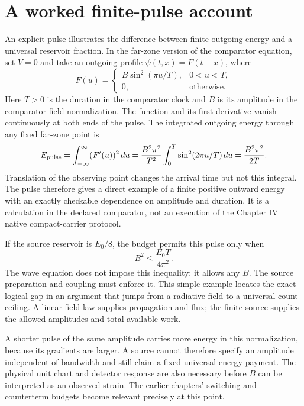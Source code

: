 \section{A worked finite-pulse account}
An explicit pulse illustrates the difference between finite outgoing energy and a universal reservoir fraction. In the far-zone version of the comparator equation, set $V=0$ and take an outgoing profile $\psi(t,x)=F(t-x)$, where
\begin{equation}
 F(u)=
 \begin{cases}
 B\sin^2(\pi u/T),&0<u<T,\\
 0,&\text{otherwise}.
 \end{cases}
 \label{c11:pulseprofile}
\end{equation}
Here $T>0$ is the duration in the comparator clock and $B$ is its amplitude in the comparator field normalization. The function and its first derivative vanish continuously at both ends of the pulse. The integrated outgoing energy through any fixed far-zone point is
\begin{equation}
 E_{\rm pulse}=\int_{-\infty}^{\infty}(F'(u))^2\,du
 =\frac{B^2\pi^2}{T^2}\int_0^T\sin^2(2\pi u/T)\,du
 =\frac{B^2\pi^2}{2T}.
 \label{c11:pulseenergy}
\end{equation}
Translation of the observing point changes the arrival time but not this integral. The pulse therefore gives a direct example of a finite positive outward energy with an exactly checkable dependence on amplitude and duration. It is a calculation in the declared comparator, not an execution of the Chapter IV native compact-carrier protocol.

If the source reservoir is $E_0/8$, the budget permits this pulse only when
\begin{equation}
 B^2\leq\frac{E_0T}{4\pi^2}.
 \label{c11:pulsebudget}
\end{equation}
The wave equation does not impose this inequality: it allows any $B$. The source preparation and coupling must enforce it. This simple example locates the exact logical gap in an argument that jumps from a radiative field to a universal count ceiling. A linear field law supplies propagation and flux; the finite source supplies the allowed amplitudes and total available work.

A shorter pulse of the same amplitude carries more energy in this normalization, because its gradients are larger. A source cannot therefore specify an amplitude independent of bandwidth and still claim a fixed universal energy payment. The physical unit chart and detector response are also necessary before $B$ can be interpreted as an observed strain. The earlier chapters' switching and counterterm budgets become relevant precisely at this point.

